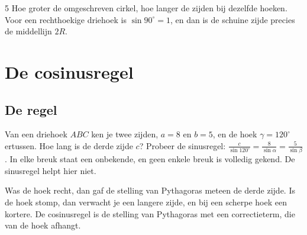 \begin{alleenvoor}{5}
Hoe groter de omgeschreven cirkel, hoe langer de zijden bij dezelfde hoeken. Voor een rechthoekige driehoek is $\sin 90^\circ = 1$, en dan is de schuine zijde precies de middellijn $2R$.


\begin{oefeningen}
\end{oefeningen}
\end{alleenvoor}

\section{De cosinusregel}

\subsection{De regel}

Van een driehoek $ABC$ ken je twee zijden, $a = 8$ en $b = 5$, en de hoek $\gamma = 120^\circ$ ertussen. Hoe lang is de derde zijde $c$? Probeer de sinusregel: $\frac{c}{\sin 120^\circ} = \frac{8}{\sin\alpha} = \frac{5}{\sin\beta}$. In elke breuk staat een onbekende, en geen enkele breuk is volledig gekend. De sinusregel helpt hier niet.

Was de hoek recht, dan gaf de stelling van Pythagoras meteen de derde zijde. Is de hoek stomp, dan verwacht je een langere zijde, en bij een scherpe hoek een kortere. De cosinusregel is de stelling van Pythagoras met een correctieterm, die van de hoek afhangt.

